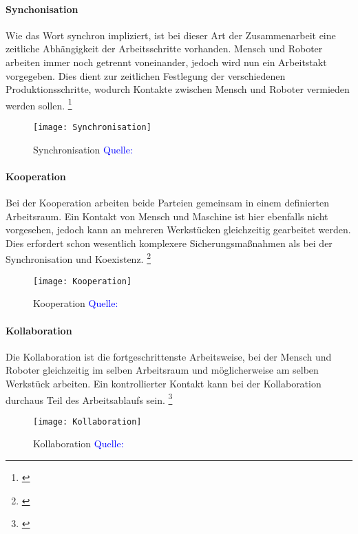 \documentclass[titlepage,12pt,twoside]{article}
\begin{document}
\paragraph{Synchonisation}
\hfill \break
\hfill \break
Wie das Wort synchron impliziert, ist bei dieser Art der Zusammenarbeit eine 
zeitliche Abhängigkeit der Arbeitsschritte vorhanden. Mensch und Roboter arbeiten 
immer noch getrennt voneinander, jedoch wird nun ein Arbeitstakt vorgegeben. Dies 
dient zur zeitlichen Festlegung der verschiedenen Produktionsschritte, wodurch 
Kontakte zwischen Mensch und Roboter vermieden werden sollen. \footnote{\cite{rubigm.p11}}\\
\begin{figure}[H]
	\begin{center}
		\scalebox{0.4}
		{\texttt{[image: Synchronisation]}}
		\caption{Synchronisation \textcolor{blue}{Quelle: \cite{rubigm.p11}}}
		\label{fig:Synchronisation}
	\end{center}
\end{figure}
\hfill \break
\paragraph{Kooperation}
\hfill \break
\hfill \break
Bei der Kooperation arbeiten beide Parteien gemeinsam in einem definierten 
Arbeitsraum. Ein Kontakt von Mensch und Maschine ist hier ebenfalls nicht 
vorgesehen, jedoch kann an mehreren Werkstücken gleichzeitig gearbeitet werden. 
Dies erfordert schon wesentlich komplexere Sicherungsmaßnahmen als bei der 
Synchronisation und Koexistenz. \footnote{\cite{rubigm.p11}}\\
\begin{figure}[H]
	\begin{center}
		\scalebox{0.4}
		{\texttt{[image: Kooperation]}}
		\caption{Kooperation \textcolor{blue}{Quelle: \cite{rubigm.p11}}}
		\label{fig:Kooperation}
	\end{center}
\end{figure}
\hfill \break
\paragraph{Kollaboration}
\hfill \break
\hfill \break
Die Kollaboration ist die fortgeschrittenste Arbeitsweise, bei der Mensch und 
Roboter gleichzeitig im selben Arbeitsraum und möglicherweise am selben Werkstück 
arbeiten. Ein kontrollierter Kontakt kann bei der Kollaboration durchaus Teil des 
Arbeitsablaufs sein. \footnote{\cite{rubigm.p11}}\\
\begin{figure}[H]
	\begin{center}
		\scalebox{0.4}
		{\texttt{[image: Kollaboration]}}
		\caption{Kollaboration \textcolor{blue}{Quelle: \cite{rubigm.p11}}}
		\label{fig:Kollaboration}
	\end{center}
\end{figure}
\end{document}
